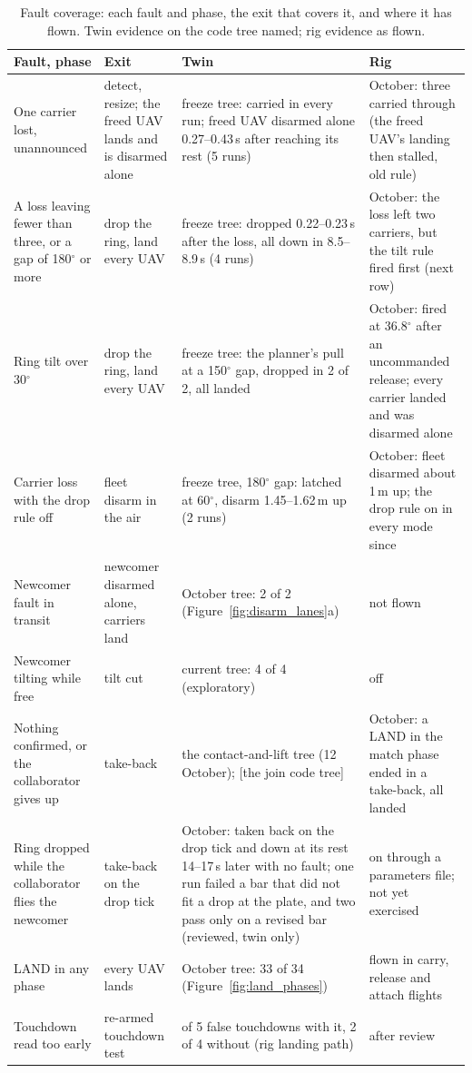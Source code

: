 \begin{table}[htbp]
\centering
\footnotesize
\caption[Fault coverage]{Fault coverage: each fault and phase, the exit that covers it, and where it has flown. Twin
evidence on the code tree named; rig evidence as flown.}
\label{tab:faults}
\begin{tabularx}{\textwidth}{>{\raggedright\arraybackslash}p{3.2cm}>{\raggedright\arraybackslash}p{2.6cm}>{\raggedright\arraybackslash}X>{\raggedright\arraybackslash}X}
\toprule
Fault, phase & Exit & Twin & Rig \\
\midrule
One carrier lost, unannounced & detect, resize; the freed UAV lands and is disarmed alone & freeze tree: carried in every run; freed UAV disarmed alone 0.27--0.43\,s after reaching its rest (5 runs) & 8 October: three carried through (the freed UAV's landing then stalled, old rule) \\
A loss leaving fewer than three, or a gap of 180$^\circ$ or more & drop the ring, land every UAV & freeze tree: dropped 0.22--0.23\,s after the loss, all down in 8.5--8.9\,s (4 runs) & 15 October: the loss left two carriers, but the tilt rule fired first (next row) \\
Ring tilt over 30$^\circ$ & drop the ring, land every UAV & freeze tree: the planner's pull at a 150$^\circ$ gap, dropped in 2 of 2, all landed & 15 October: fired at 36.8$^\circ$ after an uncommanded release; every carrier landed and was disarmed alone \\
Carrier loss with the drop rule off & fleet disarm in the air & freeze tree, 180$^\circ$ gap: latched at 60$^\circ$, disarm 1.45--1.62\,m up (2 runs) & 14 October: fleet disarmed about 1\,m up; the drop rule on in every mode since \\
Newcomer fault in transit & newcomer disarmed alone, carriers land & 9 October tree: 2 of 2 (Figure~\ref{fig:disarm_lanes}a) & not flown \\
Newcomer tilting while free & tilt cut & current tree: 4 of 4 (exploratory) & off \\
Nothing confirmed, or the collaborator gives up & take-back & the contact-and-lift tree (12 October); [the join code tree] & 15 October: a LAND in the match phase ended in a take-back, all landed \\
Ring dropped while the collaborator flies the newcomer & take-back on the drop tick & 16 October: taken back on the drop tick and down at its rest 14--17\,s later with no fault; one run failed a bar that did not fit a drop at the plate, and two pass only on a revised bar (reviewed, twin only) & on through a parameters file; not yet exercised \\
LAND in any phase & every UAV lands & 9 October tree: 33 of 34 (Figure~\ref{fig:land_phases}) & flown in carry, release and attach flights \\
Touchdown read too early & re-armed touchdown test & 0 of 5 false touchdowns with it, 2 of 4 without (rig landing path) & after review \\
\bottomrule
\end{tabularx}
\end{table}

